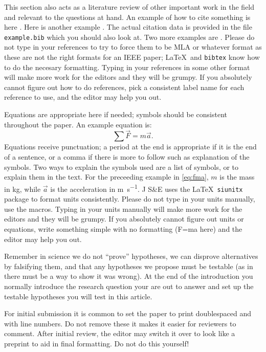 \documentclass[10pt,draftcls,journal,onecolumn]{IEEEtran}
\begin{document}
This section also acts as a literature review of other important work in the field and relevant to the questions at hand. An example of how to cite something is here \cite{tipler}. Here is another example \cite{openstax}. The actual citation data is provided in the file \texttt{example.bib} which you should also look at. Two more examples are \cite{rombauer:1931:joy, binzel:1988:hemispherical}. Please do not type in your references to try to force them to be MLA or whatever format as these are not the right formats for an IEEE paper; \LaTeX\ and \texttt{bibtex} know how to do the necesary formatting. Typing in your references in some other format will make more work for the editors and they will be grumpy. If you absolutely cannot figure out how to do references, pick a consistent label name for each reference to use, and the editor may help you out. 

Equations are appropriate here if needed; symbols should be consistent throughout the paper. An example equation is:
\begin{equation}
\sum \vec{F} = m \vec{a}.
\label{eq:fma} %
\end{equation}
Equations receive punctuation; a period at the end is appropriate if it is the end of a sentence, or a comma if there is more to follow such as explanation of the symbols. Two ways to explain the symbols used are a list of symbols, or to explain them in the text. For the preceeding example in \cref{eq:fma}, $m$ is the mass in \unit{\kilo\gram}, while $\vec{a}$ is the acceleration in \unit{\meter\per\second}. J S\&E uses the \LaTeX\ \texttt{siunitx} package to format units consistently. Please do not type in your units manually, use the macros. Typing in your units manually will make more work for the editors and they will be grumpy. If you absolutely cannot figure out units or equations, write something simple with no formatting (F=ma here) and the editor may help you out. 

Remember in science we do not ``prove'' hypotheses, we can disprove alternatives by falsifying them, and that any hypotheses we propose must be testable (as in there must be a way to show it was wrong). At the end of the introduction you normally introduce the research question your are out to answer and set up the testable hypotheses you will test in this article. 

For initial submission it is common to set the paper to print doublespaced and with line numbers. Do not remove these it makes it easier for reviewers to comment. After initial review, the editor may switch it over to look like a preprint to aid in final formatting. Do not do this yourself! 
\end{document}

